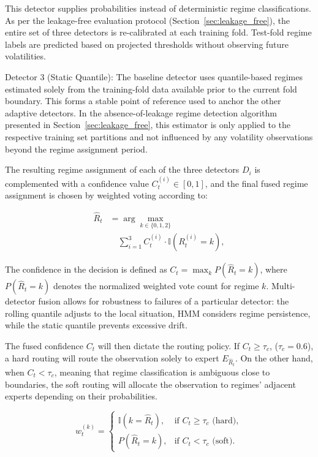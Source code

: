\documentclass[]{interact}
\begin{document}
This detector supplies probabilities instead of deterministic
regime classifications. As per the leakage-free evaluation
protocol (Section~\ref{sec:leakage_free}), the entire set of three detectors is
re-calibrated at each training fold. Test-fold regime labels are
predicted based on projected thresholds without observing
future volatilities.

Detector 3 (Static Quantile): The baseline detector uses
quantile-based regimes estimated solely from the training-fold
data available prior to the current fold boundary. This forms a
stable point of reference used to anchor the other adaptive detectors.
In the absence-of-leakage regime detection algorithm presented in
Section~\ref{sec:leakage_free}, this estimator is only applied to the respective
training set partitions and not influenced by any volatility observations
beyond the regime assignment period.

The resulting regime assignment of each of the three detectors
$D_i$ is complemented with a confidence value $C_t^{(i)} \in [0,1]$,
and the final fused regime assignment is chosen by weighted
voting according to:

\begin{equation}
\begin{split}
\hat{R}_t &= \arg\max_{k \in \{0,1,2\}} \\
&\quad \sum_{i=1}^{3} C_t^{(i)} \cdot \mathbb{I}(R_t^{(i)} = k),
\end{split}
\label{eq:fusion}
\end{equation}

The confidence in the decision is defined as
$C_t = \max_k P(\hat{R}_t = k)$, where $P(\hat{R}_t = k)$ denotes the
normalized weighted vote count for regime $k$. Multi-detector
fusion allows for robustness to failures of a particular detector: the
rolling quantile adjusts to the local situation, HMM considers
regime persistence, while the static quantile prevents excessive drift.

The fused confidence $C_t$ will then dictate the routing policy.
If $C_t \geq \tau_c$, ($\tau_c = 0.6$), a hard routing will route the observation
solely to expert $E_{\hat{R}_t}$. On the other hand, when $C_t < \tau_c$,
meaning that regime classification is ambiguous close to boundaries,
the soft routing will allocate the observation to regimes' adjacent experts
depending on their probabilities.

\begin{equation}
w_t^{(k)} =
\begin{cases}
\mathbb{I}(k = \hat{R}_t), & \text{if } C_t \geq \tau_c \text{ (hard)}, \\
P(\hat{R}_t = k), & \text{if } C_t < \tau_c \text{ (soft)}.
\end{cases}
\label{eq:routing}
\end{equation}
\end{document}
